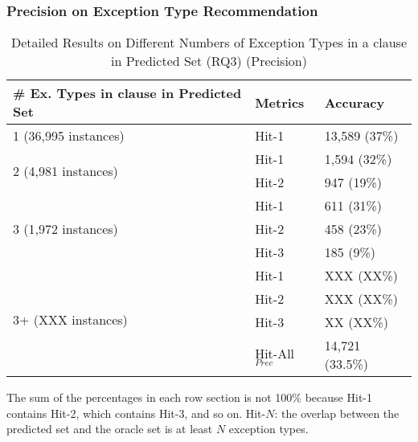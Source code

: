 
\subsubsection{{\bf Precision on Exception Type Recommendation}}
\label{sec:req3-precision}


\begin{table}[t]
  \caption{Detailed Results on Different Numbers of Exception Types in a  clause in Predicted Set (RQ3) (Precision)}
	\vspace{-12pt}
	{\small
	  \begin{center}
            \tabcolsep 2pt
			\renewcommand{\arraystretch}{1}
			\begin{tabular}{p{5cm}<{\centering}|p{1.4cm}<{\centering}|p{1.6cm}<{\centering}}
				\hline
				\# Ex. Types in \code{catch} clause in Predicted Set & Metrics & Accuracy \\
				\hline
				\multirow{1}{*}{1 (36,995 instances)}   & Hit-1  & 13,589 (37\%) \\
				\hline
				\multirow{2}{*}{2 (4,981 instances)}  & Hit-1   & 1,594 (32\%) \\
				& Hit-2       						& 947 (19\%) \\
				\hline
				\multirow{3}{*}{3 (1,972 instances)}  & Hit-1    & 611 (31\%) \\
				& Hit-2         					& 458 (23\%)\\
				& Hit-3         				  	& 185 (9\%) \\
                                \hline
                                \multirow{4}{*}{3+ (XXX instances)}  & Hit-1   & XXX (XX\%) \\
				& Hit-2     & XXX (XX\%) \\
				& Hit-3     & XX (XX\%)\\
                                \hline
                                & Hit-All$_{Prec}$ & 14,721 (33.5\%)\\
				\hline
			\end{tabular}
                        The sum of the percentages in each row section is not 100\% because Hit-1 contains Hit-2, which contains Hit-3, and so on. Hit-$N$: the overlap between the predicted set and the oracle set is at least $N$ exception types.
			\label{tab:precision-3}
		\end{center}
	}
\end{table}

